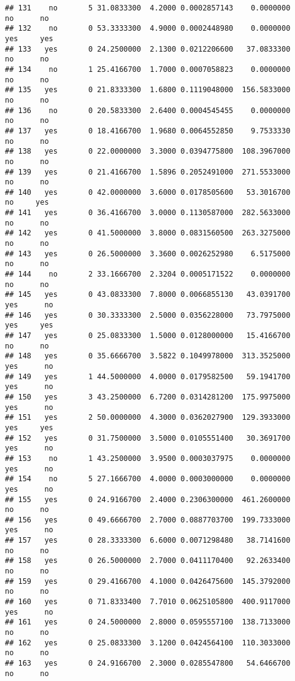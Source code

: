 \documentclass[]{article}
\begin{document}
\begin{verbatim}
## 131    no       5 31.0833300  4.2000 0.0002857143    0.0000000    no      no
## 132    no       0 53.3333300  4.9000 0.0002448980    0.0000000   yes     yes
## 133   yes       0 24.2500000  2.1300 0.0212206600   37.0833300    no      no
## 134    no       1 25.4166700  1.7000 0.0007058823    0.0000000    no      no
## 135   yes       0 21.8333300  1.6800 0.1119048000  156.5833000    no      no
## 136    no       0 20.5833300  2.6400 0.0004545455    0.0000000    no      no
## 137   yes       0 18.4166700  1.9680 0.0064552850    9.7533330    no      no
## 138   yes       0 22.0000000  3.3000 0.0394775800  108.3967000    no      no
## 139   yes       0 21.4166700  1.5896 0.2052491000  271.5533000    no      no
## 140   yes       0 42.0000000  3.6000 0.0178505600   53.3016700    no     yes
## 141   yes       0 36.4166700  3.0000 0.1130587000  282.5633000    no      no
## 142   yes       0 41.5000000  3.8000 0.0831560500  263.3275000    no      no
## 143   yes       0 26.5000000  3.3600 0.0026252980    6.5175000    no      no
## 144    no       2 33.1666700  2.3204 0.0005171522    0.0000000    no      no
## 145   yes       0 43.0833300  7.8000 0.0066855130   43.0391700   yes      no
## 146   yes       0 30.3333300  2.5000 0.0356228000   73.7975000   yes     yes
## 147   yes       0 25.0833300  1.5000 0.0128000000   15.4166700    no      no
## 148   yes       0 35.6666700  3.5822 0.1049978000  313.3525000   yes      no
## 149   yes       1 44.5000000  4.0000 0.0179582500   59.1941700   yes      no
## 150   yes       3 43.2500000  6.7200 0.0314281200  175.9975000   yes      no
## 151   yes       2 50.0000000  4.3000 0.0362027900  129.3933000   yes     yes
## 152   yes       0 31.7500000  3.5000 0.0105551400   30.3691700   yes      no
## 153    no       1 43.2500000  3.9500 0.0003037975    0.0000000   yes      no
## 154    no       5 27.1666700  4.0000 0.0003000000    0.0000000   yes      no
## 155   yes       0 24.9166700  2.4000 0.2306300000  461.2600000    no      no
## 156   yes       0 49.6666700  2.7000 0.0887703700  199.7333000   yes      no
## 157   yes       0 28.3333300  6.6000 0.0071298480   38.7141600    no      no
## 158   yes       0 26.5000000  2.7000 0.0411170400   92.2633400    no      no
## 159   yes       0 29.4166700  4.1000 0.0426475600  145.3792000    no      no
## 160   yes       0 71.8333400  7.7010 0.0625105800  400.9117000   yes      no
## 161   yes       0 24.5000000  2.8000 0.0595557100  138.7133000    no      no
## 162   yes       0 25.0833300  3.1200 0.0424564100  110.3033000    no      no
## 163   yes       0 24.9166700  2.3000 0.0285547800   54.6466700    no      no

\end{verbatim}
\end{document}
